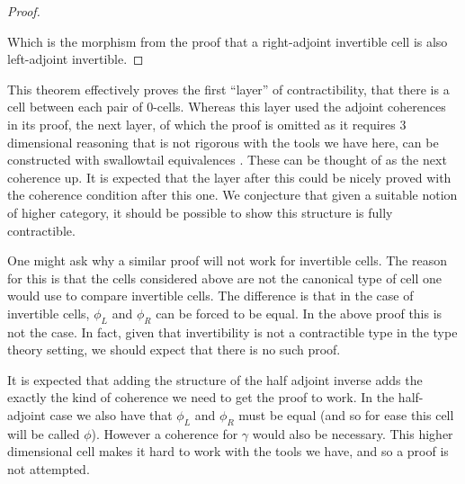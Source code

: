 \documentclass[draft]{article}
\theoremstyle{definition} \newtheorem{definition}{Definition}
\theoremstyle{remark} \newtheorem{remark}{Remark}
\begin{document}
\begin{proof}
\begin{center}
  \end{center}

  Which is the morphism from the proof that a right-adjoint invertible
  cell is also left-adjoint invertible.
\end{proof}

This theorem effectively proves the first ``layer'' of
contractibility, that there is a cell between each pair of
\(0\)-cells. Whereas this layer used the adjoint coherences in its
proof, the next layer, of which the proof is omitted as it requires 3
dimensional reasoning that is not rigorous with the tools we have
here, can be constructed with swallowtail equivalences
. These can be thought of as the next coherence up. It
is expected that the layer after this could be nicely proved with the
coherence condition after this one. We conjecture that given a
suitable notion of higher category, it should be possible to show this
structure is fully contractible.

One might ask why a similar proof will not work for invertible cells.
The reason for this is that the cells considered above are not the
canonical type of cell one would use to compare invertible cells. The
difference is that in the case of invertible cells, \(\phi_L\) and
\(\phi_R\) can be forced to be equal. In the above proof this is not
the case. In fact, given that invertibility is not a contractible type
in the type theory setting, we should expect that there is no such
proof.

It is expected that adding the structure of the half adjoint inverse
adds the exactly the kind of coherence we need to get the proof to
work. In the half-adjoint case we also have that \(\phi_L\) and
\(\phi_R\) must be equal (and so for ease this cell will be called
\(\phi\)). However a coherence for \(\gamma\) would also be necessary.
This higher dimensional cell makes it hard to work with the tools we
have, and so a proof is not attempted.
\end{document}
